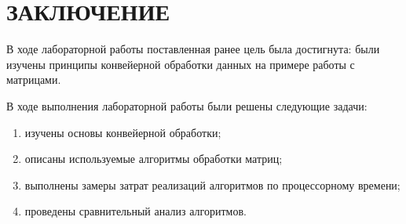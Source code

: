 \chapter*{ЗАКЛЮЧЕНИЕ}

В ходе лабораторной работы поставленная ранее цель была достигнута:
были изучены принципы конвейерной обработки данных на примере работы
с матрицами. 

В ходе выполнения лабораторной работы были решены следующие задачи:

\begin{enumerate}
    \item изучены основы конвейерной обработки;
    \item описаны используемые алгоритмы обработки матриц;
    \item выполнены замеры затрат реализаций алгоритмов по процессорному времени;
    \item проведены сравнительный анализ алгоритмов.
\end{enumerate}
